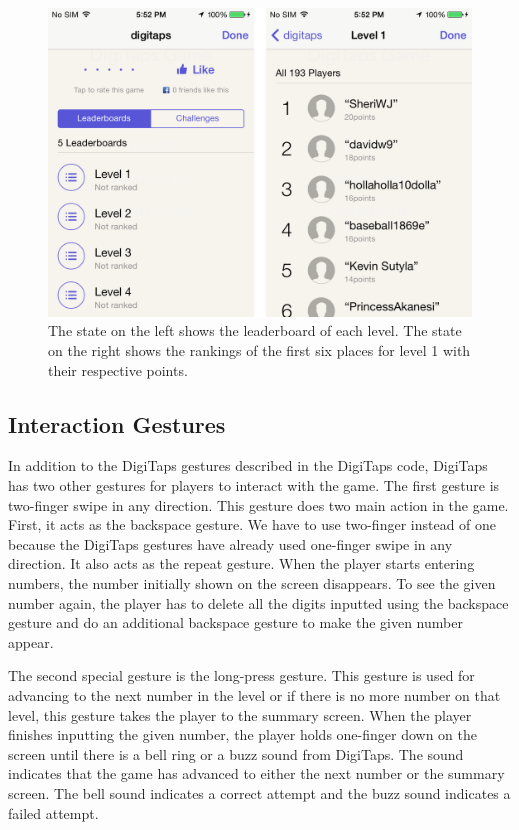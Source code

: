 \begin{figure}[h!]
  \centering
  \includegraphics[width=1.0\textwidth]{figures/leaderboard.png}
  \caption{The state on the left shows the leaderboard of each level. The state on the right shows the rankings of the first six places for level 1 with their respective points.}
  \label{leaderboard}
\end{figure}

\subsection{Interaction Gestures}
In addition to the DigiTaps gestures described in the DigiTaps code, DigiTaps has two other gestures for players to interact with the game. The first gesture is two-finger swipe in any direction. This gesture does two main action in the game. First, it acts as the backspace gesture. We have to use two-finger instead of one because the DigiTaps gestures have already used one-finger swipe in any direction. It also acts as the repeat gesture. When the player starts entering numbers, the number initially shown on the screen disappears. To see the given number again, the player has to delete all the digits inputted using the backspace gesture and do an additional backspace gesture to make the given number appear.
\par
The second special gesture is the long-press gesture. This gesture is used for advancing to the next number in the level or if there is no more number on that level, this gesture takes the player to the summary screen. When the player finishes inputting the given number, the player holds one-finger down on the screen until there is a bell ring or a buzz sound from DigiTaps. The sound indicates that the game has advanced to either the next number or the summary screen. The bell sound indicates a correct attempt and the buzz sound indicates a failed attempt.

